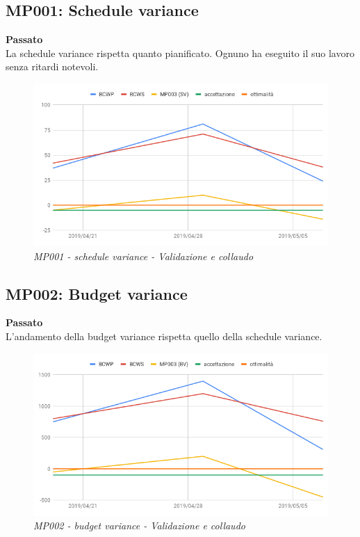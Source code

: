 \subsection{MP001: Schedule variance}
\textbf{Passato}\\
La schedule variance rispetta quanto pianificato. Ognuno ha eseguito il suo lavoro senza ritardi notevoli.
\begin{figure} [H]
    \centering
	\includegraphics[scale=0.4]{./images/RA_schedule.png}
	\caption{\textit{MP001 - schedule variance - Validazione e collaudo}}\label{}
\end{figure}

\subsection{MP002: Budget variance}
\textbf{Passato}\\
L'andamento della budget variance rispetta quello della schedule variance.\\
\begin{figure} [H]
    \centering
	\includegraphics[scale=0.5]{./images/RA_budget.png}
	\caption{\textit{MP002 - budget variance - Validazione e collaudo}}\label{}
\end{figure}
